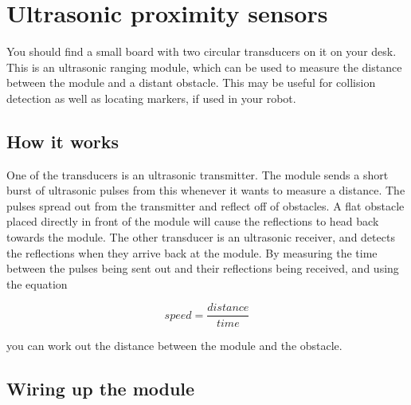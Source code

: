 \documentclass{article}
\begin{document}




\newpage

\section{Ultrasonic proximity sensors}


You should find a small board with two circular transducers on it on your desk.
This is an ultrasonic ranging module, which can be used to measure the distance
between the module and a distant obstacle. This may be useful for collision
detection as well as locating markers, if used in your robot.

\subsection{How it works}

One of the transducers is an ultrasonic transmitter. The module sends a short
burst of ultrasonic pulses from this whenever it wants to measure a distance.
The pulses spread out from the transmitter and reflect off of obstacles. A flat
obstacle placed directly in front of the module will cause the reflections to
head back towards the module. The other transducer is an ultrasonic receiver,
and detects the reflections when they arrive back at the module. By measuring
the time between the pulses being sent out and their reflections being received,
and using the equation

\begin{equation*}
speed = \frac{distance}{time}
\end{equation*}

you can work out the distance between the module and the obstacle.

\subsection{Wiring up the module}
\end{document}
